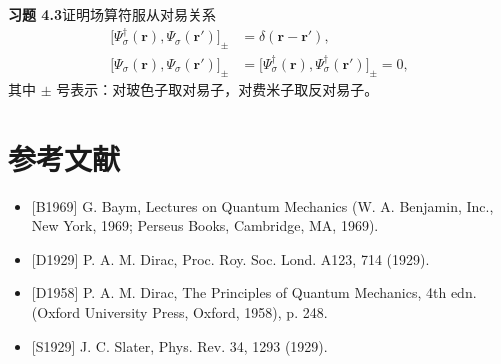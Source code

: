 \textbf{习题 4.3}\quad 证明场算符服从对易关系
\begin{align*}
\bigl[\Psi_\sigma^\dagger(\mathbf{r}),\Psi_\sigma(\mathbf{r}')\bigr]_\pm &= \delta(\mathbf{r}-\mathbf{r}'), \\
\bigl[\Psi_\sigma(\mathbf{r}),\Psi_\sigma(\mathbf{r}')\bigr]_\pm &= \bigl[\Psi_\sigma^\dagger(\mathbf{r}),\Psi_\sigma^\dagger(\mathbf{r}')\bigr]_\pm=0,
\tag{4.41}
\end{align*}
其中 $\pm$ 号表示：对玻色子取对易子，对费米子取反对易子。

\section*{参考文献}
\begin{itemize}[leftmargin=2em,itemsep=0pt,parsep=0pt,label={}]
\item {[}B1969] G. Baym, Lectures on Quantum Mechanics (W. A. Benjamin, Inc., New York, 1969; Perseus Books, Cambridge, MA, 1969).
\item {[}D1929] P. A. M. Dirac, Proc. Roy. Soc. Lond. A123, 714 (1929).
\item {[}D1958] P. A. M. Dirac, The Principles of Quantum Mechanics, 4th edn. (Oxford University Press, Oxford, 1958), p. 248.
\item {[}S1929] J. C. Slater, Phys. Rev. 34, 1293 (1929).
\end{itemize}
